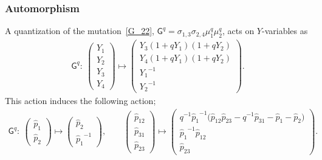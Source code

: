 \documentclass[10pt,a4paper]{amsart}
\numberwithin{equation}{section}
\begin{document}
\subsubsection*{Automorphism}
A quantization of the mutation~\eqref{G_22}, $\mathsf{G}^q = \sigma_{1,3} \sigma_{2,4} \mu^q_1 \mu^q_2 $, acts on $Y$-variables as
\begin{gather*}
 \mathsf{G}^q\colon \
 \begin{pmatrix}
 Y_1 \\ Y_2 \\ Y_3 \\Y_4
 \end{pmatrix}
 \mapsto
 \begin{pmatrix}
 Y_3 ( 1+q Y_1 ) ( 1+q Y_2 ) \\
 Y_4 ( 1+q Y_1 ) ( 1+q Y_2 ) \\
 {Y_1}^{-1} \\
 {Y_2}^{-1}
 \end{pmatrix} .
\end{gather*}
This action induces the following action;
\begin{gather*}
 \mathsf{G}^q \colon \
 \begin{pmatrix}
 \hat{p}_1 \\
 \hat{p}_2
 \end{pmatrix}
 \mapsto
 \begin{pmatrix}
 \hat{p}_2 \\
 {\hat{p}_1}^{-1}
 \end{pmatrix} ,
 \qquad
 \begin{pmatrix}
 \hat{p}_{12} \\
 \hat{p}_{31} \\
 \hat{p}_{23}
 \end{pmatrix}
 \mapsto
 \begin{pmatrix}
 q^{-1} {\hat{p}_1}^{-1} \big( \hat{p}_{12} \hat{p}_{23} - q^{-1} \hat{p}_{31} - \hat{p}_1 - \hat{p}_2 \big) \\
 {\hat{p}_1}^{-1} \hat{p}_{12} \\
 \hat{p}_{23}
 \end{pmatrix} .
\end{gather*}
\end{document}
